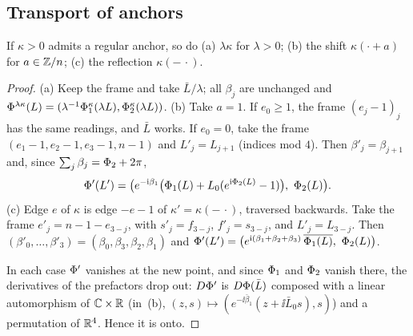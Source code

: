 \subsection{Transport of anchors}

\begin{proposition}\label{prop:invariance}
If $\kappa>0$ admits a regular anchor, so do
\textup{(a)} $\lambda\kappa$ for $\lambda>0$;
\textup{(b)} the shift $\kappa(\cdot+a)$ for $a\in\mathbb{Z}/n$;
\textup{(c)} the reflection $\kappa(-\,\cdot)$.
\end{proposition}

\begin{proof}
(a) Keep the frame and take $\bar L/\lambda$; all $\beta_j$ are unchanged and
$\Phi^{\lambda\kappa}(L)=(\lambda^{-1}\Phi_1^\kappa(\lambda L),\Phi_2^\kappa(\lambda L))$.
(b) Take $a=1$. If $e_0\ge1$, the frame $(e_j-1)_j$ has the same readings, and
$\bar L$ works. If $e_0=0$, take the frame $(e_1-1,e_2-1,e_3-1,n-1)$ and
$L'_j=L_{j+1}$ (indices mod $4$). Then $\beta'_j=\beta_{j+1}$ and, since
$\sum_j\beta_j=\Phi_2+2\pi$,
\[
  \Phi'(L')=\bigl(e^{-\mathrm{i}\beta_1}\bigl(\Phi_1(L)+L_0(e^{\mathrm{i}\Phi_2(L)}-1)\bigr),\
  \Phi_2(L)\bigr).
\]
(c) Edge $e$ of $\kappa$ is edge $-e-1$ of $\kappa'=\kappa(-\,\cdot)$,
traversed backwards. Take the frame $e'_j=n-1-e_{3-j}$, with $s'_j=f_{3-j}$,
$f'_j=s_{3-j}$, and $L'_j=L_{3-j}$. Then
$(\beta'_0,\dots,\beta'_3)=(\beta_0,\beta_3,\beta_2,\beta_1)$ and
$\Phi'(L')=\bigl(e^{\mathrm{i}(\beta_1+\beta_2+\beta_3)}\,\overline{\Phi_1(L)},\
\Phi_2(L)\bigr)$.

In each case $\Phi'$ vanishes at the new point, and since $\Phi_1$ and
$\Phi_2$ vanish there, the derivatives of the prefactors drop out:
$D\Phi'$ is $D\Phi(\bar L)$ composed with a linear automorphism of
$\mathbb{C}\times\mathbb{R}$ (in~(b), $(z,s)\mapsto(e^{-\ii\bar\beta_1}(z+\ii\bar L_0s),s)$)
and a permutation of $\mathbb{R}^4$. Hence it is onto.
\end{proof}

